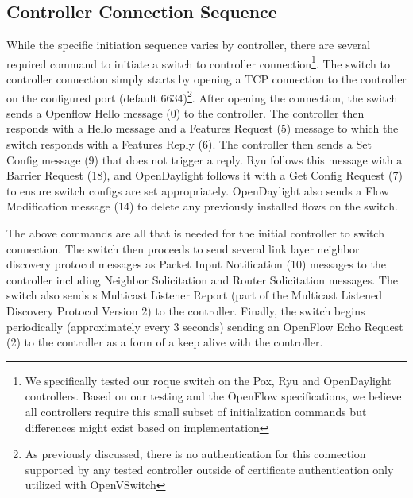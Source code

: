\subsection {Controller Connection Sequence}
While the specific initiation sequence varies by controller, there are several required command to initiate a switch to controller connection\footnote{We specifically tested our roque switch on the Pox, Ryu and OpenDaylight controllers. Based on our testing and the OpenFlow specifications, we believe all controllers require this small subset of initialization commands but differences might exist based on implementation}. The switch to controller connection simply starts by opening a TCP connection to the controller on the configured port (default 6634)\footnote{As previously discussed, there is no authentication for this connection supported by any tested controller outside of certificate authentication only utilized with OpenVSwitch}.  After opening the connection, the switch sends a Openflow Hello message (0) to the controller. The controller then responds with a Hello message and a Features Request (5) message to which the switch responds with a  Features Reply (6). The controller then sends a Set Config message (9) that does not trigger a reply. Ryu follows this message with a Barrier Request (18), and OpenDaylight follows it with a  Get Config Request (7) to ensure switch configs are set appropriately. OpenDaylight also sends a Flow Modification message (14) to delete any previously installed flows on the switch.

The above commands are all that is needed for the initial controller to switch connection. The switch then proceeds to send several link layer neighbor discovery protocol messages as Packet Input Notification (10) messages to the controller including  Neighbor Solicitation and Router Solicitation messages. The switch also sends s Multicast Listener Report (part of the Multicast Listened Discovery Protocol Version 2) to the controller. Finally, the switch begins periodically (approximately every 3 seconds) sending an OpenFlow Echo Request (2) to the controller as a form of a keep alive with the controller.

